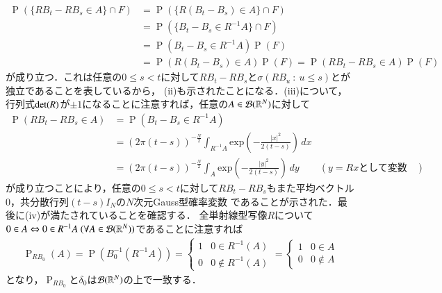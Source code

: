 \begin{prf}
\begin{description}
		\begin{align}
			\operatorname{P}\left(\{RB_t - RB_s \in A\} \cap F \right) 
			&= \operatorname{P}\left(\{R(B_t - B_s) \in A\} \cap F \right) \\
			&= \operatorname{P}\left(\{B_t - B_s \in R^{-1}A\} \cap F \right) \\
			&= \operatorname{P}\left(B_t - B_s \in R^{-1}A\right)\operatorname{P}(F) \\
			&= \operatorname{P}\left(R(B_t - B_s) \in A\right)\operatorname{P}(F)
			= \operatorname{P}\left(RB_t - RB_s \in A\right)\operatorname{P}(F)
		\end{align}
		が成り立つ．これは任意の$0 \leq s < t$に対して$RB_t - RB_s$と$\sigma(RB_u\ :\ u \leq s)$とが独立であることを表しているから，
		(ii)も示されたことになる．(iii)について，行列式$\operatorname{det} ( R )$が$\pm 1$になることに注意すれば，任意の$A \in \mathcal{B}(\mathbb{R}^N)$に対して
		\begin{align}
			\operatorname{P}(RB_t - RB_s \in A) &= \operatorname{P}\left(B_t - B_s \in R^{-1}A\right) \\
			&= (2\pi(t-s))^{-\frac{N}{2}} \int_{R^{-1}A} \mathrm{exp}\left( -\frac{|x|^2}{2(t-s)} \right)\, dx \\
			&= (2\pi(t-s))^{-\frac{N}{2}} \int_{A} \mathrm{exp}\left( -\frac{|y|^2}{2(t-s)} \right)\, dy & \left(y = Rx\mbox{として変数変換}\right)
		\end{align}
		が成り立つことにより，任意の$0 \leq s < t$に対して$RB_t - RB_s$もまた平均ベクトル0，共分散行列$(t-s)I_N$の$N$次元Gauss型確率変数
		であることが示された．最後に(iv)が満たされていることを確認する．
		全単射線型写像$R$について$0 \in A \Leftrightarrow 0 \in R^{-1}A\ (\forall A \in \mathcal{B}(\mathbb{R}^N))$であることに注意すれば
		\begin{align}
			\operatorname{P}_{RB_0}(A) 
			= \operatorname{P}\left(B_0^{-1}\left(R^{-1}A\right)\right) 
			= \begin{cases}
				1 & 0 \in R^{-1}(A) \\
				0 & 0 \notin R^{-1}(A)
			\end{cases}
			= \begin{cases}
				1 & 0 \in A \\
				0 & 0 \notin A
			\end{cases}
		\end{align}
		となり，$\operatorname{P}_{RB_0}$と$\delta_0$は$\mathcal{B}(\mathbb{R}^N)$の上で一致する．
	

\end{description}
\end{prf}
